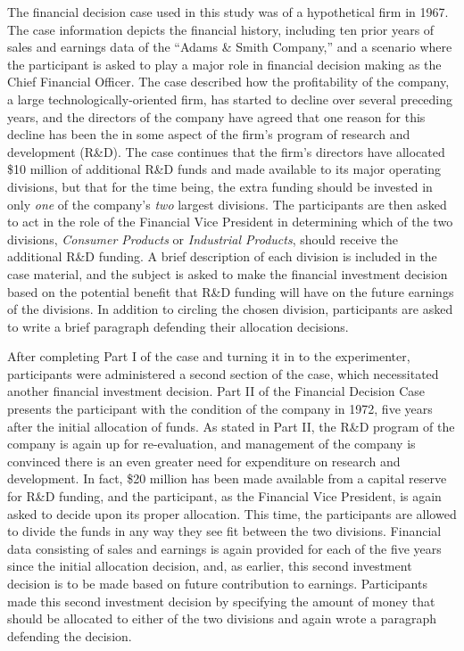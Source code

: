 \documentclass{article}
\begin{document}
The financial decision case used in this study was of a hypothetical firm in 1967. The case information depicts the financial history, including ten prior years of sales and earnings data of the ``Adams \& Smith Company,'' and a scenario where the participant is asked to play a major role in financial decision making as the Chief Financial Officer. The case described how the profitability of the company, a large technologically-oriented firm, has started to decline over several preceding years, and the directors of the company have agreed that one reason for this decline has been the in some aspect of the firm's program of research and development (R\&D). The case continues that the firm's directors have allocated \$10 million of additional R\&D funds and made available to its major operating divisions, but that for the time being, the extra funding should be invested in only \textit{one} of the company's \textit{two} largest divisions. The participants are then asked to act in the role of the Financial Vice President in determining which of the two divisions, \textit{Consumer Products} or \textit{Industrial Products}, should receive the additional R\&D funding. A brief description of each division is included in the case material, and the subject is asked to make the financial investment decision based on the potential benefit that R\&D funding will have on the future earnings of the divisions. In addition to circling the chosen division, participants are asked to write a brief paragraph defending their allocation decisions.

After completing Part I of the case and turning it in to the experimenter, participants were administered a second section of the case, which necessitated another financial investment decision. Part II of the Financial Decision Case presents the participant with the condition of the company in 1972, five years after the initial allocation of funds. As stated in Part II, the R\&D program of the company is again up for re-evaluation, and management of the company is convinced there is an even greater need for expenditure on research and development. In fact, \$20 million has been made available from a capital reserve for R\&D funding, and the participant, as the Financial Vice President, is again asked to decide upon its proper allocation. This time, the participants are allowed to divide the funds in any way they see fit between the two divisions. Financial data consisting of sales and earnings is again provided for each of the five years since the initial allocation decision, and, as earlier, this second investment decision is to be made based on future contribution to earnings. Participants made this second investment decision by specifying the amount of money that should be allocated to either of the two divisions and again wrote a paragraph defending the decision.
\end{document}
